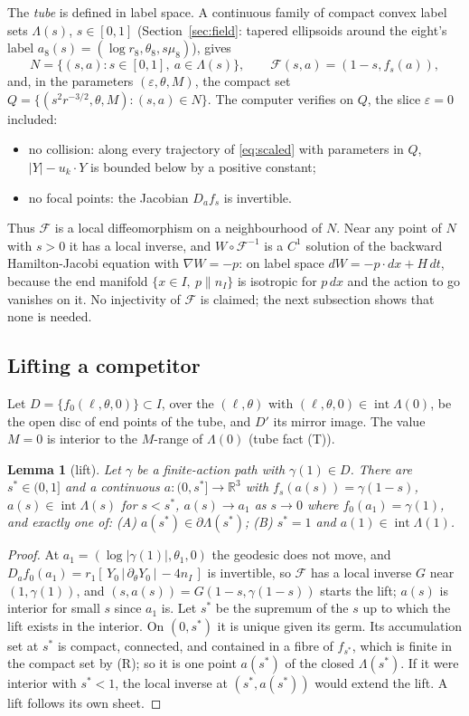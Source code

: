 \documentclass[11pt]{article}
\newtheorem{lemma}[theorem]{Lemma}
\theoremstyle{definition}
\begin{document}
The \emph{tube} is defined in label space. A continuous family of compact convex label sets $\Lambda(s)$, $s\in[0,1]$
(Section~\ref{sec:field}: tapered ellipsoids around the eight's label $a_8(s)=(\log r_8,\theta_8,s\mu_8)$), gives
\[
N=\{(s,a):s\in[0,1],\ a\in\Lambda(s)\},\qquad \mathcal F(s,a)=(1-s,f_s(a)),
\]
and, in the parameters $(\varepsilon,\theta,M)$, the compact set $Q=\{(s^2r^{-3/2},\theta,M):(s,a)\in N\}$.
The computer verifies on $Q$, the slice $\varepsilon=0$ included:
\begin{itemize}
\item[(N)] no collision: along every trajectory of \eqref{eq:scaled} with parameters in $Q$, $|Y|-u_k\cdot Y$ is bounded
below by a positive constant;
\item[(R)] no focal points: the Jacobian $D_af_s$ is invertible.
\end{itemize}
Thus $\mathcal F$ is a local diffeomorphism on a neighbourhood of $N$. Near any point of $N$ with $s>0$ it has a local
inverse, and $W\circ\mathcal F^{-1}$ is a $C^1$ solution of the backward Hamilton-Jacobi equation with
$\nabla W=-p$: on label space $dW=-p\cdot dx+H\,dt$, because the end manifold $\{x\in I,\ p\parallel n_I\}$ is
isotropic for $p\,dx$ and the action to go vanishes on it. No injectivity of $\mathcal F$ is claimed; the next
subsection shows that none is needed.

\subsection{Lifting a competitor}\label{sec:lift}
Let $D=\{f_0(\ell,\theta,0)\}\subset I$, over the $(\ell,\theta)$ with $(\ell,\theta,0)\in\operatorname{int}\Lambda(0)$, be the
open disc of end points of the tube, and $D'$ its mirror image. The value $M=0$ is interior to the $M$-range of
$\Lambda(0)$ (tube fact (T)).

\begin{lemma}[lift]\label{lem:lift}
Let $\gamma$ be a finite-action path with $\gamma(1)\in D$. There are $s^*\in(0,1]$ and a continuous
$a:(0,s^*]\to\mathbb R^3$ with $f_s(a(s))=\gamma(1-s)$, $a(s)\in\operatorname{int}\Lambda(s)$ for $s<s^*$, $a(s)\to a_1$
as $s\to0$ where $f_0(a_1)=\gamma(1)$, and exactly one of:
(A) $a(s^*)\in\partial\Lambda(s^*)$; (B) $s^*=1$ and $a(1)\in\operatorname{int}\Lambda(1)$.
\end{lemma}
\begin{proof}
At $a_1=(\log|\gamma(1)|,\theta_1,0)$ the geodesic does not move, and $D_af_0(a_1)=r_1[\,Y_0\,|\,\partial_\theta Y_0\,|\,
-4n_I\,]$ is invertible, so $\mathcal F$ has a local inverse $G$ near $(1,\gamma(1))$, and
$(s,a(s))=G(1-s,\gamma(1-s))$ starts the lift; $a(s)$ is interior for small $s$ since $a_1$ is. Let $s^*$ be the
supremum of the $s$ up to which the lift exists in the interior. On $(0,s^*)$ it is unique given its germ. Its
accumulation set at $s^*$ is compact, connected, and contained in a fibre of $f_{s^*}$, which is finite in the compact
set by (R); so it is one point $a(s^*)$ of the closed $\Lambda(s^*)$. If it were interior with $s^*<1$, the local
inverse at $(s^*,a(s^*))$ would extend the lift. A lift follows its own sheet.
\end{proof}
\end{document}
